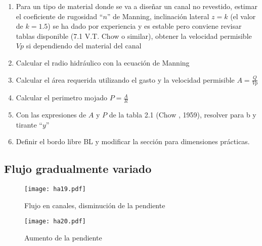 \begin{enumerate}
    \item Para un tipo de material donde se va a diseñar un canal no revestido, estimar el coeficiente de rugosidad ``$n$'' de Manning, inclinación lateral $z=k$ (el valor de $k=1.5$) se ha dado por experiencia y es estable pero conviene revisar tablas disponible (7.1 V.T. Chow o similar), obtener la velocidad permisible $Vp$ si dependiendo del material del canal
    \item Calcular el radio hidráulico con la ecuación de Manning
    \item Calcular el área requerida utilizando el gasto y la velocidad permisible $A= \frac{Q}{Vp}$
    \item Calcular el perimetro mojado $P= \frac{A}{R}$
    \item Con las expresiones de $A$ y $P$ de la tabla 2.1 (Chow , 1959), resolver para b y tirante ``$y$''
    \item Definir el bordo libre BL y modificar la sección para dimensiones prácticas.
\end{enumerate}
\subsection{Flujo gradualmente variado}

\begin{figure}[h!]
\centering
  \texttt{[image: ha19.pdf]}
  \caption{Flujo en canales, disminución de la pendiente}
  \label{ha19}
\end{figure}
\begin{figure}[h!]
\centering
  \texttt{[image: ha20.pdf]}
  \caption{Aumento de la pendiente}
  \label{ha20}
\end{figure}

